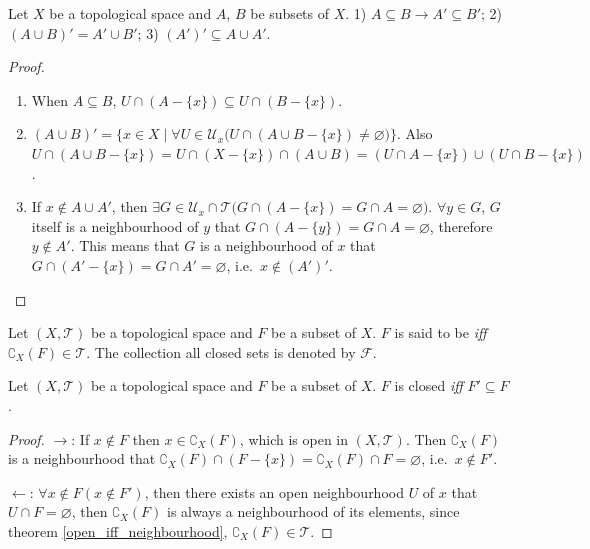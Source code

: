 \documentclass[openany]{book}
\begin{document}
\begin{theorem}\label{propoties_derived}
Let $X$ be a topological space and $A$, $B$ be subsets of $X$. 
1) $A\subseteq B \to A'\subseteq B'$; 
2) $(A\cup B)' = A'\cup B'$;
3) $(A')' \subseteq A\cup A'$.
\end{theorem}
\begin{proof}
\begin{enumerate}[label=\arabic*)]
\item When $A\subseteq B$, $U\cap (A-\{x\}) \subseteq U\cap (B-\{x\})$.
\item $(A\cup B)' = \{x\in X\mid \forall U\in \mathscr U_x \big(
	U\cap (A\cup B-\{x\}) \neq \varnothing\big)\}$. 
Also $U\cap (A\cup B - \{x\}) = U\cap (X-\{x\})\cap (A\cup B) = (U\cap A-\{x\})\cup (U\cap B-\{x\})$.
\item If $x\notin A\cup A'$, then $\exists G\in \mathscr U_x\cap \mathscr T \big(
	G\cap (A-\{x\}) = G\cap A = \varnothing\big)$. 
$\forall y \in G$, $G$ itself is a neighbourhood of $y$ that $G\cap (A-\{y\}) = G\cap A =\varnothing$, therefore $y\notin A'$. 
This means that $G$ is a neighbourhood of $x$ that $G\cap (A'-\{x\}) = G\cap A' =\varnothing$, i.e.\ $x\notin (A')'$.
\end{enumerate}
\end{proof}

\begin{definition}\label{closed_set}
Let $(X,\mathscr T)$ be a topological space and $F$ be a subset of $X$. $F$ is said to be  \emph{iff} $\complement_X (F) \in \mathscr T$. The collection all closed sets is denoted by $\mathscr F$.
\end{definition}

\begin{theorem}\label{closed_iff_accumulation}
Let $(X,\mathscr T)$ be a topological space and $F$ be a subset of $X$. $F$ is closed \emph{iff} $ F'  \subseteq F$.
\end{theorem}
\begin{proof}
$\to$: 
If $x\notin F$ then $x\in \complement_X (F)$, which is open in $(X,\mathscr T)$. 
Then $\complement_X (F)$ is a neighbourhood that $\complement_X (F) \cap (F-\{x\}) = \complement_X (F) \cap F =\varnothing$, i.e.\ $x\notin F'$.

$\leftarrow$:
$\forall x\notin F(x\notin F')$, then there exists an open neighbourhood $U$ of $x$ that $U\cap F = \varnothing$, then $\complement_X (F)$ is always a neighbourhood of its elements, since theorem \ref{open_iff_neighbourhood}, $\complement_X (F) \in \mathscr T$.
\end{proof}
\end{document}
